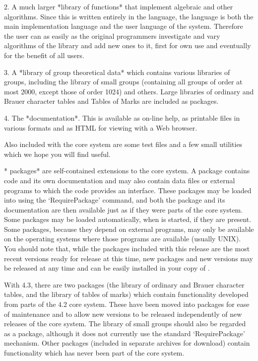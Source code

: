   \item{2.}  
	A much larger *library of {\GAP} functions* that
  implement algebraic and other algorithms.  Since this is written
  entirely in the {\GAP} language, the {\GAP} language is both the
  main implementation language and the user language of the system.
  Therefore the user can as easily as the original programmers
  investigate and vary algorithms of the library and add new ones to
  it, first for own use and eventually for the benefit of all {\GAP}
  users.

  \item{3.}  
	A *library of group theoretical data* which contains
  various libraries of groups, including the library of small groups
  (containing all groups of order at most 2000, except those of order
  1024) and others. Large libraries of ordinary and Brauer character
  tables and Tables of Marks are included as packages.

  \item{4.}
    The *documentation*.  This is available as on-line help, as
    printable files in various formats and as HTML for viewing
    with a Web browser.

\endlist

Also included with the core system are some test files and a few
small utilities which we hope you will find useful.


*{\GAP} packages* are self-contained extensions to the core system.  A
package contains {\GAP} code and its own documentation and may also
contain data files or external programs to which the {\GAP} code
provides an interface.  These packages may be loaded into {\GAP} using
the `RequirePackage' command, and both the package and its
documentation are then available just as if they were parts of the
core system. Some packages may be loaded automatically, when {\GAP} is
started, if they are present. Some packages, because they depend on
external programs, may only be available on the operating systems
where those programs are available (usually UNIX). You should note
that, while the packages included with this release are the most
recent versions ready for release at this time, new packages and new
versions may be released at any time and can be easily installed in
your copy of {\GAP}.

With {\GAP} 4.3, there are two packages (the library of ordinary and
Brauer character tables, and the library of tables of marks) which
contain functionality developed from parts of the {\GAP} 4.2 core
system. These have been moved into packages for ease of maintenance
and to allow new versions to be released independently of new releases
of the core system. The library of small groups should also be
regarded as a package, although it does not currently use the standard
`RequirePackage' mechanism.  Other packages (included in separate
archives for download) contain functionality which has never been part
of the core system.

